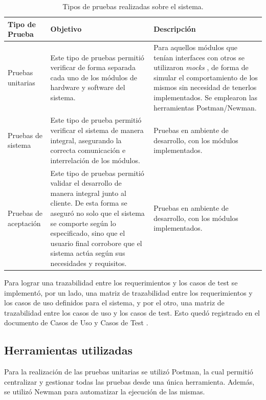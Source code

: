 \begin{table}[h]
	\centering
	\caption[Tipos de pruebas]{Tipos de pruebas realizadas sobre el sistema.}
	\begin{tabular}{p{3.0cm} p{5.5cm} p{4.0cm}} 	

		\toprule
		\textbf{Tipo de Prueba} & 
		\textbf{Objetivo } & 
		\textbf{Descripción} 
		\\
		\midrule
Pruebas unitarias  &
Este tipo de pruebas permitió verificar de forma separada cada uno de los módulos de hardware y software del sistema. 		
		   & Para aquellos módulos que tenían interfaces con otros  se utilizaron \textit{mocks} \citep{WEBSITE:Mocks}, de forma de simular el comportamiento de los mismos sin necesidad de tenerlos implementados. Se emplearon las herramientas Postman/Newman. \\	
Pruebas de sistema &
Este tipo de prueba permitió verificar el sistema de manera integral, asegurando la correcta comunicación e interrelación de los módulos. &
Pruebas en ambiente de desarrollo, con los módulos implementados. \\		Pruebas de aceptación &
Este tipo de pruebas permitió validar el desarrollo de manera integral junto al cliente. De esta forma se aseguró no solo que el sistema se comporte según lo especificado, sino que el usuario final corrobore que el sistema actúa según sus necesidades y requisitos. &
Pruebas en ambiente de desarrollo, con los módulos implementados.	\\   
		   
		   	
		\bottomrule
		\hline
	\end{tabular}
	\label{tab:tablaTiposPruebas}
\end{table}

Para lograr una trazabilidad entre los requerimientos y los casos de test se implementó, por un lado, una matriz de trazabilidad entre los requerimientos y los casos de uso definidos para el sistema, y por el otro, una matriz de trazabilidad entre los casos de uso y los casos de test. Esto quedó registrado en el documento de Casos de Uso y Casos de Test \citep{WEBSITE:CasosUsoYTest}.

\pagebreak
\subsection{Herramientas utilizadas}

Para la realización de las pruebas unitarias se utilizó Postman, la cual permitió centralizar y gestionar todas las pruebas desde una única herramienta. Además, se utilizó Newman para automatizar la ejecución de las mismas.

